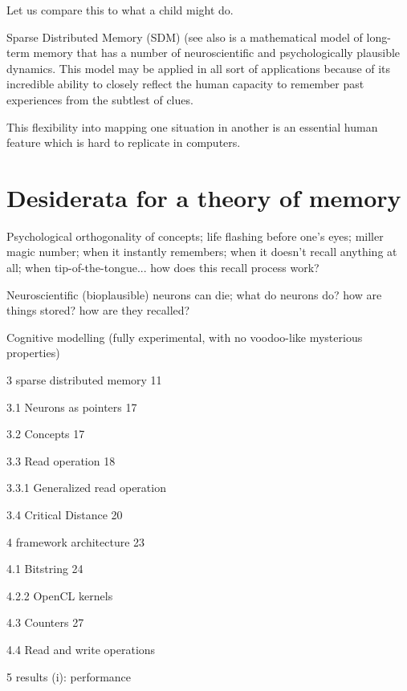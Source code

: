 Let us compare this to what a child might do.

Sparse Distributed Memory (SDM) \citep{Kanerva1988} (see also \citep{kanerva_sparse_1993, denning_sparse_1989} is a mathematical model of long-term memory that has a number of neuroscientific and psychologically plausible dynamics. This model may be applied in all sort of applications because of its incredible ability to closely reflect the human capacity to remember past experiences from the subtlest of clues.

This flexibility into mapping one situation in another is an essential human feature which is hard to replicate in computers.

\section{Desiderata for a theory of memory}




Psychological
orthogonality of concepts; life flashing before one's eyes; miller magic number; when it instantly remembers; when it doesn't recall anything at all; when tip-of-the-tongue... how does this recall process work?




Neuroscientific (bioplausible)
neurons can die; what do neurons do?  how are things stored?  how are they recalled?


Cognitive modelling (fully experimental, with no voodoo-like mysterious properties)





3 sparse distributed memory 11

3.1 Neurons as pointers 17

3.2 Concepts 17

3.3 Read operation 18

3.3.1 Generalized read operation

3.4 Critical Distance 20

4 framework architecture 23

4.1 Bitstring 24

4.2.2 OpenCL kernels

4.3 Counters 27

4.4 Read and write operations

5 results (i): performance

